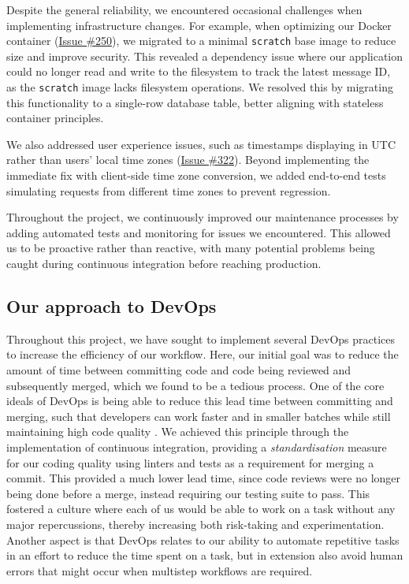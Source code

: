 Despite the general reliability, we encountered occasional challenges when implementing infrastructure changes. For example, when optimizing our Docker container (\href{https://github.com/devops-q/devops/issues/250}{Issue \#250}), we migrated to a minimal \texttt{scratch} base image to reduce size and improve security. This revealed a dependency issue where our application could no longer read and write to the filesystem to track the latest message ID, as the \texttt{scratch} image lacks filesystem operations. We resolved this by migrating this functionality to a single-row database table, better aligning with stateless container principles.

We also addressed user experience issues, such as timestamps displaying in UTC rather than users' local time zones (\href{https://github.com/devops-q/devops/issues/322}{Issue \#322}). Beyond implementing the immediate fix with client-side time zone conversion, we added end-to-end tests simulating requests from different time zones to prevent regression.

Throughout the project, we continuously improved our maintenance processes by adding automated tests and monitoring for issues we encountered. This allowed us to be proactive rather than reactive, with many potential problems being caught during continuous integration before reaching production.

\subsection{Our approach to DevOps}
Throughout this project, we have sought to implement several DevOps practices to increase the efficiency of our workflow. Here, our initial goal was to reduce the amount of time between committing code and code being reviewed and subsequently merged, which we found to be a tedious process. One of the core ideals of DevOps is being able to reduce this lead time between committing and merging, such that developers can work faster and in smaller batches while still maintaining high code quality \parencite{handbook}. We achieved this principle through the implementation of continuous integration, providing a \textit{standardisation} measure for our coding quality using linters and tests as a requirement for merging a commit. This provided a much lower lead time, since code reviews were no longer being done before a merge, instead requiring our testing suite to pass. This fostered a culture where each of us would be able to work on a task without any major repercussions, thereby increasing both risk-taking and experimentation. Another aspect is that DevOps relates to our ability to automate repetitive tasks in an effort to reduce the time spent on a task, but in extension also avoid human errors that might occur when multistep workflows are required.  
